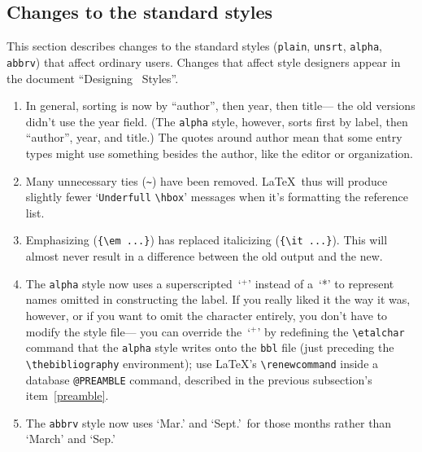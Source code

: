 \subsection{Changes to the standard styles}

This section describes changes to the standard styles
({\tt plain}, {\tt unsrt}, {\tt alpha}, {\tt abbrv})
that affect ordinary users.
Changes that affect style designers appear in
the document ``Designing \BibTeX\ Styles''\cite{btxhak}.
\begin{enumerate}

\item
In general, sorting is now by ``author''$\!$, then year, then title---%
the old versions didn't use the year field.
(The {\tt alpha} style, however, sorts first by label,
then ``author''$\!$, year, and title.)
The quotes around author mean that some entry types
might use something besides the author, like the editor or organization.

\item
Many unnecessary ties (\verb|~|) have been removed.
\LaTeX\ thus will produce slightly fewer
`\hbox{\tt Underfull} \verb|\hbox|' messages
when it's formatting the reference list.

\item
Emphasizing (\hbox{\verb|{\em ...}|})
has replaced italicizing (\hbox{\verb|{\it ...}|}).
This will almost never result in a difference
between the old output and the new.

\item
The {\tt alpha} style now uses a superscripted~`$^{+}$' instead of a~`*'
to represent names omitted in constructing the label.
If you really liked it the way it was, however,
or if you want to omit the character entirely,
you don't have to modify the style file---%
you can override the~`$^{+}$' by
redefining the \hbox{\verb|\etalchar|} command
that the {\tt alpha} style writes onto the {\tt bbl} file
(just preceding the \hbox{\verb|\thebibliography|} environment);
use \LaTeX's \hbox{\verb|\renewcommand|} inside
a database \hbox{\tt @PREAMBLE} command,
described in the previous subsection's item~\ref{preamble}.

\item
The {\tt abbrv} style now uses `Mar.' and `Sept.'\
for those months rather than `March' and `Sep.'


\end{enumerate}
